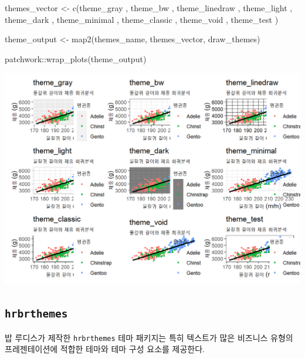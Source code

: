 \documentclass[
  letterpaper,
]{book}
\newenvironment{Shaded}{\begin{snugshade}}{\end{snugshade}}
\newcommand{\FunctionTok}[1]{\textcolor[rgb]{0.28,0.35,0.67}{#1}}
\newcommand{\NormalTok}[1]{\textcolor[rgb]{0.00,0.23,0.31}{#1}}
\newcommand{\OtherTok}[1]{\textcolor[rgb]{0.00,0.23,0.31}{#1}}
\newcommand{\SpecialCharTok}[1]{\textcolor[rgb]{0.37,0.37,0.37}{#1}}
\begin{document}
\begin{Shaded}
\begin{Highlighting}[]
\NormalTok{themes\_vector }\OtherTok{\textless{}{-}} \FunctionTok{c}\NormalTok{(theme\_gray , theme\_bw , theme\_linedraw , }
\NormalTok{                  theme\_light , theme\_dark , theme\_minimal , theme\_classic , }
\NormalTok{                  theme\_void , theme\_test )}

\NormalTok{theme\_output }\OtherTok{\textless{}{-}} \FunctionTok{map2}\NormalTok{(themes\_name, themes\_vector, draw\_themes)}

\NormalTok{patchwork}\SpecialCharTok{::}\FunctionTok{wrap\_plots}\NormalTok{(theme\_output)}
\end{Highlighting}
\end{Shaded}

\includegraphics{images/penguin_ggplot_theme.png}

\hypertarget{hrbrthemes}{%
\subsection{\texorpdfstring{\texttt{hrbrthemes}}{hrbrthemes}}\label{hrbrthemes}}

밥 루디스가 제작한 \texttt{hrbrthemes} 테마 패키지는 특히 텍스트가 많은
비즈니스 유형의 프레젠테이션에 적합한 테마와 테마 구성 요소를 제공한다.
\end{document}
